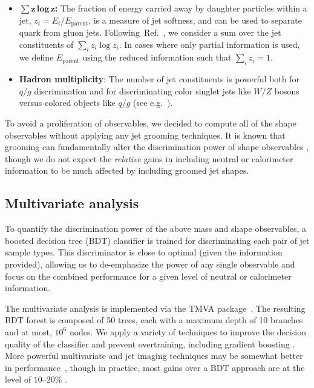 \documentclass[11pt,letterpaper]{article}
\DeclareRobustCommand{\Ref}[1]{Ref.~\cite{#1}}
\begin{document}
\begin{itemize}
\item \textbf{$\sum\mathbf{z\,\text{log}\, z}$:} The fraction of energy carried away by daughter particles within a jet, $z_i = E_i/E_{\text{parent}}$, is a measure of jet softness, and can be used to separate quark from gluon jets.  Following~\Ref{Larkoski:2014pca}, we consider a sum over the jet constituents of $\sum_i z_i \log z_i$.  In cases where only partial information is used, we define $E_{\text{parent}}$ using the reduced information such that $\sum_i z_i = 1$.

\item \textbf{Hadron multiplicity}: The number of jet constituents is powerful both for $q/g$ discrimination and for discriminating color singlet jets like $W/Z$ bosons versus colored objects like $q/g$ (see e.g.~\cite{Gallicchio:2011xq,Gallicchio:2012ez,Aad:2014gea,Larkoski:2014pca,ATLAS:2016wzt,Aad:2016oit}).

\end{itemize}

To avoid a proliferation of observables, we decided to compute all of the shape observables without applying any jet grooming techniques.  It is known that grooming can fundamentally alter the discrimination power of shape observables \cite{Moult:2016cvt,Salam:2016yht}, though we do not expect the \emph{relative} gains in including neutral or calorimeter information to be much affected by including groomed jet shapes.

\subsection{Multivariate analysis}
\label{sec:mvas}

To quantify the discrimination power of the above mass and shape observables, a boosted decision tree (BDT) classifier is trained for discriminating each pair of jet sample types.
%
This discriminator is close to optimal (given the information provided), allowing us to de-emphasize the power of any single observable and focus on the combined performance for a given level of neutral or calorimeter information.

The multivariate analysis is implemented via the TMVA package~\cite{Hocker:2007ht}.
%
The resulting BDT forest is composed of 50 trees, each with a maximum depth of 10 branches and at most, $10^6$ nodes. We apply a variety of techniques to improve the decision quality of the classifier and prevent overtraining, including gradient boosting \cite{Friedman00greedyfunction}.
%  
More powerful multivariate and jet imaging techniques may be somewhat better in performance~\cite{deOliveira:2015xxd}, though in practice, most gains over a BDT approach are at the level of $10$--$20\%$ \cite{Baldi:2016fql,Datta:2017rhs}.
\end{document}
